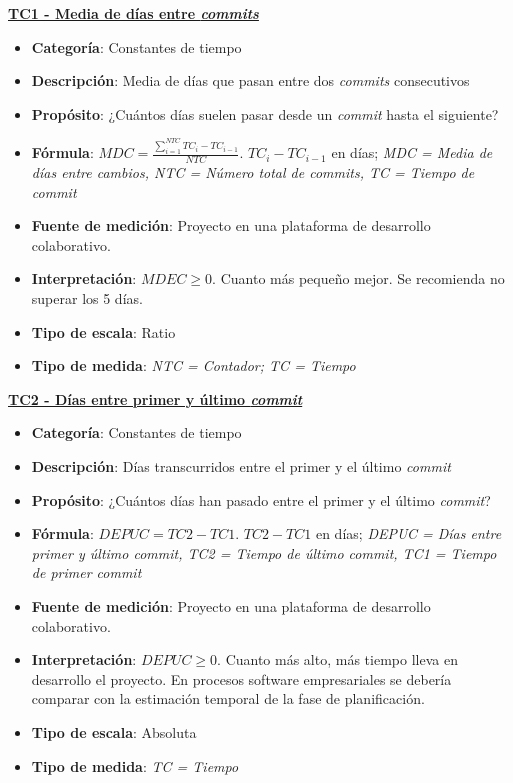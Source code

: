 \textbf{\underline{TC1 - Media de días entre \textit{commits}}}

\begin{itemize}
	\item \textbf{Categoría}: Constantes de tiempo
	\item \textbf{Descripción}: Media de días que pasan entre dos \textit{commits} consecutivos
	\item \textbf{Propósito}: ¿Cuántos días suelen pasar desde un \textit{commit} hasta el siguiente?
	\item \textbf{Fórmula}: $MDC = \frac{\sum_{i=1}^{NTC} TC_i - TC_{i-1}}{NTC}$. $TC_i - TC_{i-1}$ en días; \textit{MDC = Media de días entre cambios, NTC = Número total de \textit{commits}, TC = Tiempo de \textit{commit}}
	\item \textbf{Fuente de medición}: Proyecto en una plataforma de desarrollo colaborativo.
	\item \textbf{Interpretación}: $MDEC \geq 0$. Cuanto más pequeño mejor. Se recomienda no superar los 5 días.
	\item \textbf{Tipo de escala}: Ratio
	\item \textbf{Tipo de medida}: \textit{NTC = Contador; TC = Tiempo}
\end{itemize}

\textbf{\underline{TC2 - Días entre primer y último \textit{commit}}}

\begin{itemize}
	\item \textbf{Categoría}: Constantes de tiempo
	\item \textbf{Descripción}: Días transcurridos entre el primer y el último \textit{commit} 
	\item \textbf{Propósito}: ¿Cuántos días han pasado entre el primer y el último \textit{commit}?
	\item \textbf{Fórmula}: $DEPUC = TC2- TC1$. $TC2- TC1$ en días;  \textit{DEPUC = Días entre primer y último \textit{commit}, TC2 = Tiempo de último \textit{commit}, TC1 = Tiempo de primer \textit{commit}}
	\item \textbf{Fuente de medición}: Proyecto en una plataforma de desarrollo colaborativo.
	\item \textbf{Interpretación}: $DEPUC \geq 0$. Cuanto más alto, más tiempo lleva en desarrollo el proyecto. En procesos software empresariales se debería comparar con la estimación temporal de la fase de planificación. 
	\item \textbf{Tipo de escala}: Absoluta
	\item \textbf{Tipo de medida}: \textit{TC = Tiempo}
\end{itemize}


